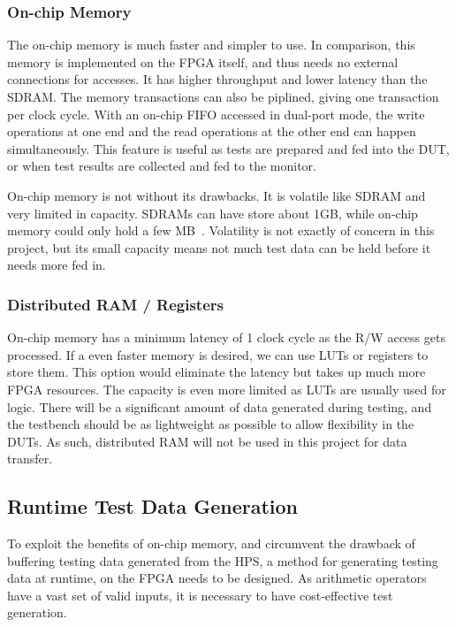 \subsubsection{\textbf{On-chip Memory}}
The on-chip memory is much faster and simpler to use.
In comparison, this memory is implemented on the FPGA itself, and thus needs
no external connections for accesses.
It has higher throughput and lower latency than the SDRAM.
The memory transactions can also be piplined, giving one transaction per
clock cycle.
With an on-chip FIFO accessed in dual-port mode, the write operations at one
end and the read operations at the other end can happen simultaneously.
This feature is useful as tests are prepared and fed into the DUT, or when test
results are collected and fed to the monitor.

On-chip memory is not without its drawbacks.
It is volatile like SDRAM and very limited in capacity.
SDRAMs can have store about 1GB, while on-chip memory could only hold a few
MB~\cite{Altera2}.
Volatility is not exactly of concern in this project, but its small capacity
means not much test data can be held before it needs more fed in.

\subsubsection{\textbf{Distributed RAM / Registers}}
On-chip memory has a minimum latency of 1 clock cycle as the R/W access gets
processed.
If a even faster memory is desired, we can use LUTs or registers to store them.
This option would eliminate the latency but takes up much more FPGA resources.
The capacity is even more limited as LUTs are usually used for logic.
There will be a significant amount of data generated during testing, and the
testbench should be as lightweight as possible to allow flexibility in the DUTs.
As such, distributed RAM will not be used in this project for data transfer.

\subsection{Runtime Test Data Generation}
To exploit the benefits of on-chip memory, and circumvent the drawback of
buffering testing data generated from the HPS, a method for generating testing
data at runtime, on the FPGA needs to be designed.
As arithmetic operators have a vast set of valid inputs, it is necessary to
have cost-effective test generation.

